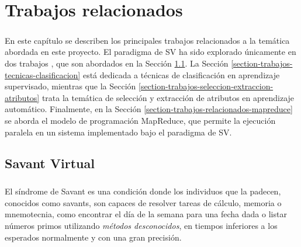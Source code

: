 \chapter{Trabajos relacionados} \label{section-trabajo-relacionado}

\paragraph{}En este capítulo se describen los principales trabajos relacionados a la temática abordada en este proyecto.
El paradigma de SV ha sido explorado únicamente en dos trabajos \cite{savant-original} \cite{savant-bag}, que son abordados en la Sección \ref{section-trabajos-relacionados-savant}.
La Sección \ref{section-trabajos-tecnicas-clasificacion} está dedicada a técnicas de clasificación en aprendizaje supervisado, mientras que la Sección \ref{section-trabajos-seleccion-extraccion-atributos} trata la temática de selección y extracción de atributos en aprendizaje automático.
Finalmente, en la Sección \ref{section-trabajos-relacionados-mapreduce} se aborda el modelo de programación MapReduce, que permite la ejecución paralela en un sistema implementado bajo el paradigma de SV.


\section{Savant Virtual} \label{section-trabajos-relacionados-savant}

\paragraph{} El síndrome de Savant es una condición donde los individuos que la padecen, conocidos como savants, son capaces de resolver tareas de cálculo, memoria o mnemotecnia, como encontrar el día de la semana para una fecha dada o listar números primos utilizando \textit{métodos desconocidos}, en tiempos inferiores a los esperados normalmente y con una gran precisión. 

